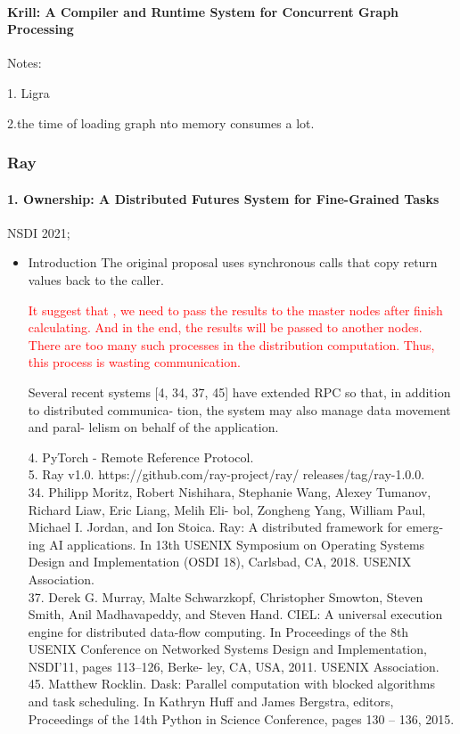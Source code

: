 \documentclass[UTF8]{article}
\newcommand{\com}[1]{\textcolor{red}{#1}}
\begin{document}
\paragraph{Krill: A Compiler and Runtime System for Concurrent Graph Processing}
Notes:

1. Ligra 

2.the time of loading graph nto memory consumes a lot. 

\subsubsection{Ray}
\paragraph{1. Ownership: A Distributed Futures System for Fine-Grained Tasks~\cite{wang2021ownership}}
NSDI 2021; 

\begin{itemize}
	
	\item Introduction
	The original proposal uses synchronous calls that copy return values back to the caller. 
	
	\com{It suggest that , we need to pass the results to the master nodes after finish calculating. And in the end, the results will be passed to another nodes. There are too many such processes in the distribution computation. Thus, this process is wasting communication.} 
	
	Several recent systems [4, 34, 37, 45] have extended RPC so that, in addition to distributed communica- tion, the system may also manage data movement and paral- lelism on behalf of the application.
	
	4. PyTorch - Remote Reference Protocol. \\
	5. Ray v1.0. https://github.com/ray-project/ray/ releases/tag/ray-1.0.0.\\
	34. Philipp Moritz, Robert Nishihara, Stephanie Wang, Alexey Tumanov, Richard Liaw, Eric Liang, Melih Eli- bol, Zongheng Yang, William Paul, Michael I. Jordan, and Ion Stoica. Ray: A distributed framework for emerg- ing AI applications. In 13th USENIX Symposium on Operating Systems Design and Implementation (OSDI 18), Carlsbad, CA, 2018. USENIX Association.\\
	37. Derek G. Murray, Malte Schwarzkopf, Christopher Smowton, Steven Smith, Anil Madhavapeddy, and Steven Hand. CIEL: A universal execution engine for distributed data-flow computing. In Proceedings of the 8th USENIX Conference on Networked Systems Design and Implementation, NSDI’11, pages 113–126, Berke- ley, CA, USA, 2011. USENIX Association.\\
	45. Matthew Rocklin. Dask: Parallel computation with blocked algorithms and task scheduling. In Kathryn Huff and James Bergstra, editors, Proceedings of the 14th Python in Science Conference, pages 130 – 136, 2015.\\

\end{itemize}
\end{document}
